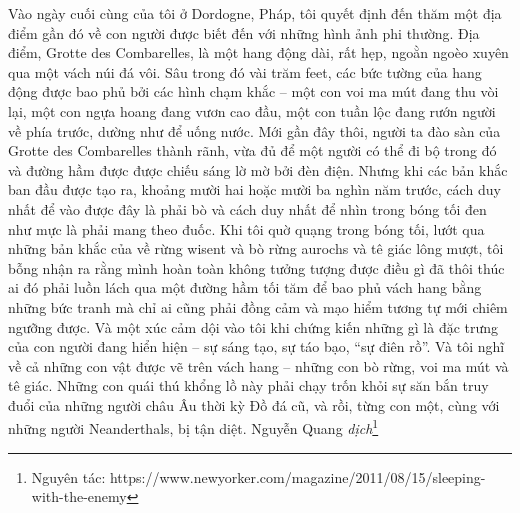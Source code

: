 \begin{multicols}{2}
	\vskip 0.1cm
	Vào ngày cuối cùng của tôi ở Dordogne, Pháp, tôi quyết định đến thăm một địa điểm gần đó về con người được biết đến với những hình ảnh phi thường. Địa điểm, Grotte des Combarelles, là một hang động dài, rất hẹp, ngoằn ngoèo xuyên qua một vách núi đá vôi. Sâu trong đó vài trăm feet, các bức tường của hang động được bao phủ bởi các hình chạm khắc -- một con voi ma mút đang thu vòi lại, một con ngựa hoang đang vươn cao đầu, một con tuần lộc đang rướn người về phía trước, dường như để uống nước. Mới gần đây thôi, người ta đào sàn của Grotte des Combarelles thành rãnh, vừa đủ để một người có thể đi bộ trong đó và đường hầm được được chiếu sáng lờ mờ bởi đèn điện. Nhưng khi các bản khắc ban đầu được tạo ra, khoảng mười hai hoặc mười ba nghìn năm trước, cách duy nhất để vào được đây là phải bò và cách duy nhất để nhìn trong bóng tối đen như mực là phải mang theo đuốc. Khi tôi quờ quạng trong bóng tối, lướt qua những bản khắc của về rừng wisent và bò rừng aurochs và tê giác lông mượt, tôi bỗng nhận ra rằng mình hoàn toàn không tưởng tượng được điều gì đã thôi thúc ai đó phải luồn lách qua một đường hầm tối tăm để bao phủ vách hang bằng những bức tranh mà chỉ ai cũng phải đồng cảm và mạo hiểm tương tự mới chiêm ngưỡng được. Và một xúc cảm dội vào tôi khi chứng kiến những gì là đặc trưng của con người đang hiển hiện -- sự sáng tạo, sự táo bạo, “sự điên rồ”. Và tôi nghĩ về cả những con vật được vẽ trên vách hang -- những con bò rừng, voi ma mút và tê giác. Những con quái thú khổng lồ này phải chạy trốn khỏi sự săn bắn truy đuổi của những người châu Âu thời kỳ Đồ đá cũ, và rồi, từng con một, cùng với những người Neanderthals, bị tận diệt.
	\vskip 0.1cm
	\hfill Nguyễn Quang \textit{dịch}\footnote[2]{\color{timhieukhoahoc}Nguyên tác: https://www.newyorker.com/magazine/2011/08/15/sleeping-with-the-enemy}
\end{multicols}



